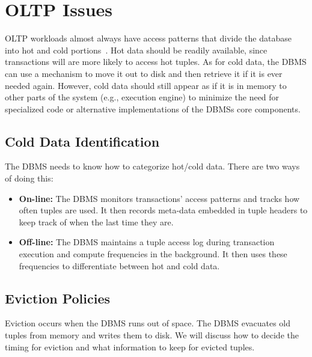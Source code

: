 \documentclass[11pt]{article}
\begin{document}
\section{OLTP Issues}
OLTP workloads almost always have access patterns that divide the database into hot and cold portions~\cite{Ma}. Hot data should be readily available, since transactions will are more likely to access hot tuples. As for cold data, the DBMS can use a mechanism to move it out to disk and then retrieve it if it is ever needed again. However, cold data should still appear as if it is in memory to other parts of the system (e.g., execution engine) to minimize the need for specialized code or alternative implementations of the DBMSs core components.

\subsection*{Cold Data Identification}
The DBMS needs to know how to categorize hot/cold data. There are two ways of doing this:
\begin{itemize}
    \item\textbf{On-line:} The DBMS monitors transactions' access patterns and tracks how often tuples are used. It then records meta-data embedded in tuple headers to keep track of when the last time they are.
    \item \textbf{Off-line:} The DBMS maintains a tuple access log during transaction execution and compute frequencies in the background. It then uses these frequencies to differentiate between hot and cold data.
\end{itemize}

\subsection*{Eviction Policies}
Eviction occurs when the DBMS runs out of space. The DBMS evacuates old tuples from memory and writes them to disk. We will discuss how to decide the timing for eviction and what information to keep for evicted tuples.
\end{document}
